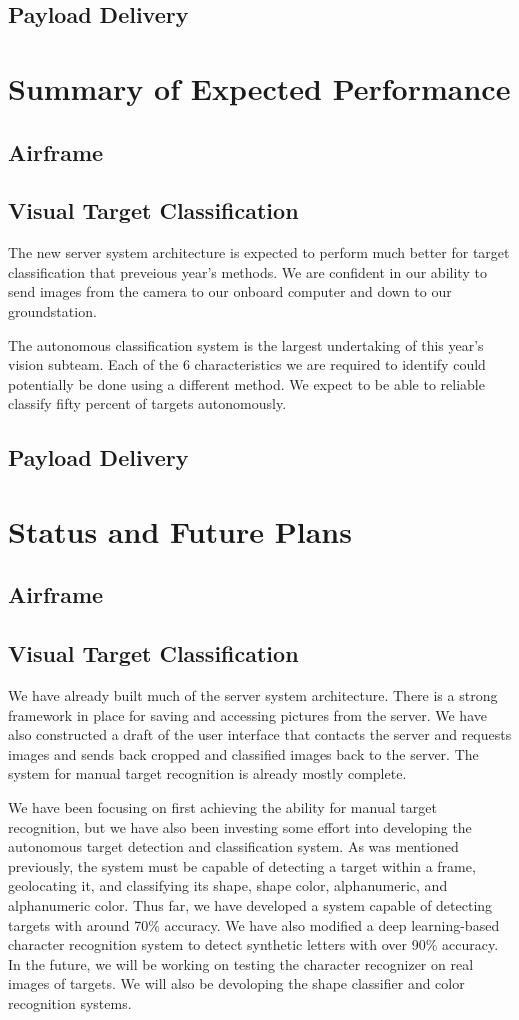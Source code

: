 \documentclass[]{auvsi_doc}
\begin{document}
\subsection{Payload Delivery}
\section{Summary of Expected Performance}
\subsection{Airframe}
\subsection{Visual Target Classification}
The new server system architecture is expected to perform much better for target classification that preveious year's methods. We are
confident in our ability to send images from the camera to our onboard computer and down to our groundstation.

The autonomous classification system is the largest undertaking of this year's vision subteam. Each of the 6 characteristics we are
required to identify could potentially be done using a different method. We expect to be able to reliable classify fifty percent of
targets autonomously.
\subsection{Payload Delivery}
\section{Status and Future Plans}
\subsection{Airframe}
\subsection{Visual Target Classification}
We have already built much of the server system architecture. There is a strong framework in place for saving and accessing pictures
from the server. We have also constructed a draft of the user interface that contacts the server and requests images and sends back
cropped and classified images back to the server. The system for manual target recognition is already mostly complete.

We have been focusing on first achieving the ability for manual target recognition, but we have also been investing some effort into developing
the autonomous target detection and classification system. As was mentioned previously, the system must be capable of detecting a target
within a frame, geolocating it, and classifying its shape, shape color, alphanumeric, and alphanumeric color. Thus far, we have developed a 
system capable of detecting targets with around 70\% accuracy. We have also modified a deep learning-based character recognition system
to detect synthetic letters with over 90\% accuracy. In the future, we will be working on testing the character recognizer on
real images of targets. We will also be devoloping the shape classifier and color recognition systems.
\end{document}
